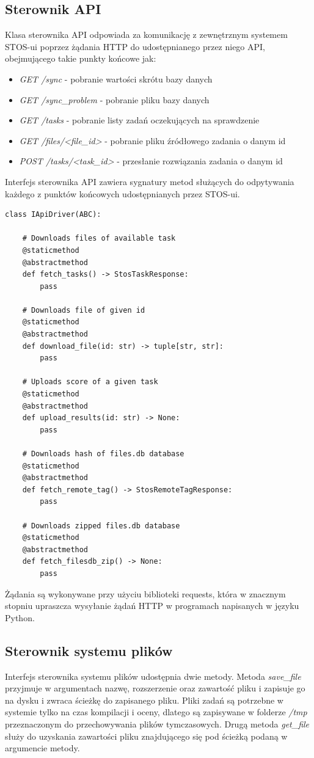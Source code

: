 \subsection{Sterownik API}
Klasa sterownika API odpowiada za komunikację z zewnętrznym systemem STOS-ui poprzez żądania HTTP do udostępnianego przez niego API, obejmującego takie punkty końcowe jak:
\begin{itemize}
    \item \textit{GET /sync} - pobranie wartości skrótu bazy danych
    \item \textit{GET /sync\_problem} - pobranie pliku bazy danych
    \item \textit{GET /tasks} - pobranie listy zadań oczekujących na sprawdzenie
    \item \textit{GET /files/<file\_id>} - pobranie pliku źródłowego zadania o danym id
    \item \textit{POST /tasks/<task\_id>} - przesłanie rozwiązania zadania o danym id
\end{itemize}
Interfejs sterownika API zawiera sygnatury metod służących do odpytywania każdego z punktów końcowych udostępnianych przez STOS-ui.
\lstset{style=python}
\begin{lstlisting}[caption = {Interfejs sterownika API.}]
    class IApiDriver(ABC):

    # Downloads files of available task
    @staticmethod
    @abstractmethod
    def fetch_tasks() -> StosTaskResponse:
        pass

    # Downloads file of given id
    @staticmethod
    @abstractmethod
    def download_file(id: str) -> tuple[str, str]:
        pass

    # Uploads score of a given task
    @staticmethod
    @abstractmethod
    def upload_results(id: str) -> None:
        pass

    # Downloads hash of files.db database
    @staticmethod
    @abstractmethod
    def fetch_remote_tag() -> StosRemoteTagResponse: 
        pass

    # Downloads zipped files.db database
    @staticmethod
    @abstractmethod
    def fetch_filesdb_zip() -> None:
        pass
\end{lstlisting}
Żądania są wykonywane przy użyciu biblioteki requests\cite{pythonRequests}, która w znacznym stopniu upraszcza wysyłanie żądań HTTP w programach napisanych w języku Python.

\subsection{Sterownik systemu plików}
Interfejs sterownika systemu plików udostępnia dwie metody. Metoda \textit{save\_file} przyjmuje w argumentach nazwę, rozszerzenie oraz zawartość pliku i zapisuje go na dysku i zwraca ścieżkę do zapisanego pliku. Pliki zadań są potrzebne w systemie tylko na czas kompilacji i oceny, dlatego są zapisywane w folderze \textit{/tmp} przeznaczonym do przechowywania plików tymczasowych. Drugą metoda \textit{get\_file} służy do uzyskania zawartości pliku znajdującego się pod ścieżką podaną w argumencie metody.

